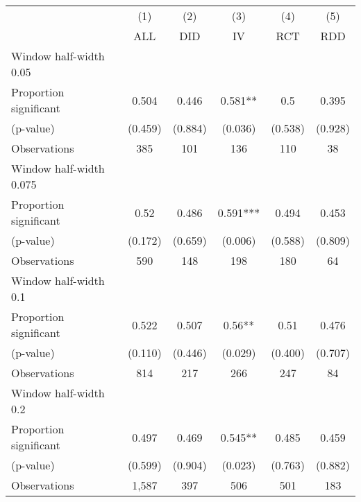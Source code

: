 
\def\sym#1{\ifmmode^{#1}\else\(^{#1}\)\fi}
\begin{tabular}{l*{5}{c}}
\hline\hline
& \multicolumn{1}{c}{(1)} &  \multicolumn{1}{c}{(2)} &  \multicolumn{1}{c}{(3)} &  \multicolumn{1}{c}{(4)} &  \multicolumn{1}{c}{(5)}\\
& \multicolumn{1}{c}{ALL} &  \multicolumn{1}{c}{DID} &  \multicolumn{1}{c}{IV} &  \multicolumn{1}{c}{RCT} &  \multicolumn{1}{c}{RDD}\\

\hline
\hline
Window half-width 0.05\\

Proportion significant& 0.504 &  0.446 &  0.581** &  0.5 &  0.395\\

(p-value) & (0.459) &  (0.884) &  (0.036) &  (0.538) &  (0.928)\\

Observations& 385 &  101 &  136 &  110 &  38\\

\hline
Window half-width 0.075\\

Proportion significant& 0.52 &  0.486 &  0.591*** &  0.494 &  0.453\\

(p-value) & (0.172) &  (0.659) &  (0.006) &  (0.588) &  (0.809)\\

Observations& 590 &  148 &  198 &  180 &  64\\

\hline
Window half-width 0.1\\

Proportion significant& 0.522 &  0.507 &  0.56** &  0.51 &  0.476\\

(p-value) & (0.110) &  (0.446) &  (0.029) &  (0.400) &  (0.707)\\

Observations& 814 &  217 &  266 &  247 &  84\\

\hline
Window half-width 0.2\\

Proportion significant& 0.497 &  0.469 &  0.545** &  0.485 &  0.459\\

(p-value) & (0.599) &  (0.904) &  (0.023) &  (0.763) &  (0.882)\\

Observations& 1,587 &  397 &  506 &  501 &  183\\


\end{tabular}
